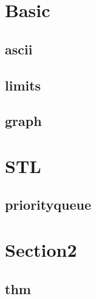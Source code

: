 \section{Basic}
    \subsection{ascii}
        
    \subsection{limits}
            
    \subsection{graph}
        

\section{STL}
    \subsection{priorityqueue}
        
        
\section{Section2}
    \subsection{thm}
        